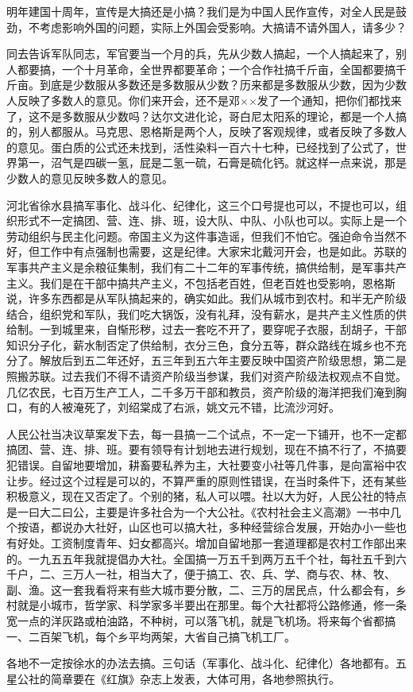 明年建国十周年，宣传是大搞还是小搞？我们是为中国人民作宣传，对全人民是鼓劲，不考虑影响外国的问题，实际上外国会受影响。大搞请不请外国人，请多少？

同去告诉军队同志，军官要当一个月的兵，先从少数人搞起，一个人搞起来了，别人都要搞，一个十月革命，全世界都要革命；一个合作社搞千斤亩，全国都要搞千斤亩。到底是少数服从多数还是多数服从少数？历来都是多数服从少数，因为少数人反映了多数人的意见。你们来开会，还不是邓××发了一个通知，把你们都找来了，这不是多数服从少数吗？达尔文进化论，哥白尼太阳系的理论，都是一个人搞的，别人都服从。马克思、恩格斯是两个人，反映了客观规律，或者反映了多数人的意见。蛋白质的公式还未找到，活性染料一百六十七种，已经找到了公式了，世界第一，沼气是四碳一氢，屁是二氢一硫，石膏是硫化钙。就这样一点来说，那是少数人的意见反映多数人的意见。

河北省徐水县搞军事化、战斗化、纪律化，这三个口号提也可以，不提也可以，组织形式不一定搞团、营、连、排、班，设大队、中队、小队也可以。实际上是一个劳动组织与民主化问题。帝国主义为这件事造谣，但我们不怕它。强迫命令当然不好，但工作中有点强制也需要，这是纪律。大家宋北戴河开会，也是如此。苏联的军事共产主义是余粮征集制，我们有二十二年的军事传统，搞供给制，是军事共产主义。我们是在干部中搞共产主义，不包括老百姓，但老百姓也受影响，恩格斯说，许多东西都是从军队搞起来的，确实如此。我们从城市到农村。和半无产阶级结合，组织党和军队，我们吃大锅饭，没有礼拜，没有薪水，是共产主义性质的供给制。一到城里来，自惭形秽，过去一套吃不开了，要穿呢子衣服，刮胡子，干部知识分子化，薪水制否定了供给制，衣分三色，食分五等，群众路线在城乡也不充分了。解放后到五二年还好，五三年到五六年主要反映中国资产阶级思想，第二是照搬苏联。过去我们不得不请资产阶级当参谋，我们对资产阶级法权观点不自觉。几亿农民，七百万生产工人，二千多万干部和教员，资产阶级的海洋把我们淹到胸口，有的人被淹死了，刘绍棠成了右派，姚文元不错，比流沙河好。

人民公社当决议草案发下去，每一县搞一二个试点，不一定一下铺开，也不一定都搞团、营、连、排、班。要有领导有计划地去进行规划，现在不搞不行了，不搞要犯错误。自留地要增加，耕畜要私养为主，大社要变小社等几件事，是向富裕中农让步。经过这个过程是可以的，不算严重的原则性错误，在当时条件下，还有某些积极意义，现在又否定了。个别的猪，私人可以喂。社以大为好，人民公社的特点是一曰大二曰公，主要是许多社合为一个大公社。《农村社会主义高潮》一书中几个按语，都说办大社好，山区也可以搞大社，多种经营综合发展，开始办小一些也有好处。工资制度青年、妇女都高兴。增加自留地那一套道理都是农村工作部出来的。一九五五年我就提倡办大社。全国搞一万五千到两万五千个社，每社五千到六千户，二、三万人一社，相当大了，便于搞工、农、兵、学、商与农、林、牧、副、渔。这一套我看将来有些大城市要分散，二、三万的居民点，什么都会有，乡村就是小城市，哲学家、科学家多半要出在那里。每个大社都将公路修通，修一条宽一点的洋灰路或柏油路，不种树，可以落飞机，就是飞机场。将来每个省都搞一、二百架飞机，每个乡平均两架，大省自己搞飞机工厂。

各地不一定按徐水的办法去搞。三句话（军事化、战斗化、纪律化）各地都有。五星公社的简章要在《红旗》杂志上发表，大体可用，各地参照执行。


